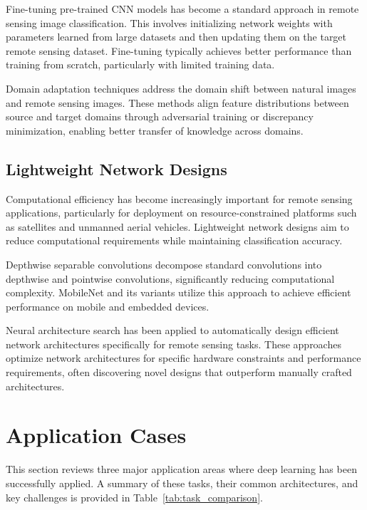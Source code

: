 \documentclass[12pt,a4paper]{article}
\begin{document}
Fine-tuning pre-trained CNN models has become a standard approach in remote sensing image classification. This involves initializing network weights with parameters learned from large datasets and then updating them on the target remote sensing dataset. Fine-tuning typically achieves better performance than training from scratch, particularly with limited training data.

Domain adaptation techniques address the domain shift between natural images and remote sensing images. These methods align feature distributions between source and target domains through adversarial training or discrepancy minimization, enabling better transfer of knowledge across domains.

\subsection{Lightweight Network Designs}
Computational efficiency has become increasingly important for remote sensing applications, particularly for deployment on resource-constrained platforms such as satellites and unmanned aerial vehicles. Lightweight network designs aim to reduce computational requirements while maintaining classification accuracy.

Depthwise separable convolutions decompose standard convolutions into depthwise and pointwise convolutions, significantly reducing computational complexity. MobileNet and its variants utilize this approach to achieve efficient performance on mobile and embedded devices.

Neural architecture search has been applied to automatically design efficient network architectures specifically for remote sensing tasks. These approaches optimize network architectures for specific hardware constraints and performance requirements, often discovering novel designs that outperform manually crafted architectures.

\section{Application Cases}
\label{sec:applications}

This section reviews three major application areas where deep learning has been successfully applied. A summary of these tasks, their common architectures, and key challenges is provided in Table~\ref{tab:task_comparison}.
\end{document}
